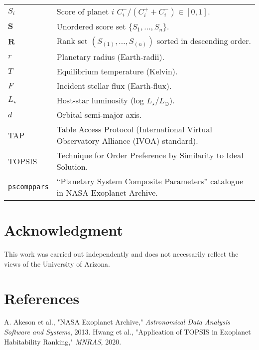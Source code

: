 \documentclass[12pt]{article}
\begin{document}
\begin{tabular}{ll}
$S_i$ & Score of planet $i$ 
$C_i^{-}/(C_i^{+}+C_i^{-})\in[0,1]$.\\
$\mathbf{S}$ & Unordered score set $\{S_1,\dots,S_n\}$.\\
$\mathbf{R}$ & Rank set $(S_{(1)},\dots,S_{(n)})$ sorted in descending order.\\
$r$ & Planetary radius (Earth‐radii).\\
$T$ & Equilibrium temperature (Kelvin).\\
$F$ & Incident stellar flux (Earth-flux).\\
$L_\star$ & Host‐star luminosity (log $\!L_\star/L_\odot$).\\
$d$  & Orbital semi-major axis.\\
TAP & Table Access Protocol (International Virtual Observatory Alliance (IVOA) standard).\\
TOPSIS & Technique for Order Preference by Similarity to Ideal Solution.\\
\texttt{pscomppars} & “Planetary System Composite Parameters” catalogue in NASA Exoplanet Archive.\\

\end{tabular}

\newpage
\section{Acknowledgment}\label{sec:acknowledgment}
This work was carried out independently and does not necessarily reflect the views of the University of Arizona.

\newpage
\section{References}\label{sec:refs}
\begin{thebibliography}{99}
 A. Akeson et al., "NASA Exoplanet Archive," \emph{Astronomical Data Analysis Software and Systems}, 2013.
 Hwang et al., "Application of TOPSIS in Exoplanet Habitability Ranking," \emph{MNRAS}, 2020.  
\end{thebibliography}
\end{document}
